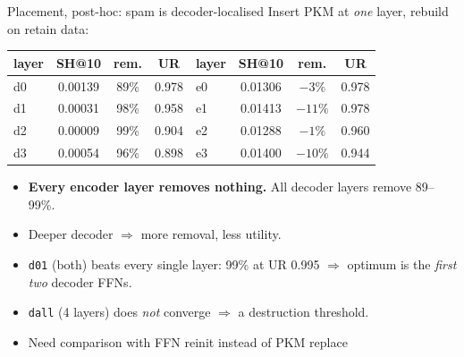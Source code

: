 \documentclass{beamer}
\begin{document}
\begin{frame}{Placement, post-hoc: spam is decoder-localised}
Insert PKM at \emph{one} layer, rebuild on retain data:
\begin{center}
\begin{tabular}{|l|c|c|c||l|c|c|c|}
\hline
layer & SH@10 & rem. & UR & layer & SH@10 & rem. & UR \\
\hline
d0 & 0.00139 & 89\% & 0.978 & e0 & 0.01306 & $-3\%$  & 0.978 \\
d1 & 0.00031 & 98\% & 0.958 & e1 & 0.01413 & $-11\%$ & 0.978 \\
d2 & 0.00009 & 99\% & 0.904 & e2 & 0.01288 & $-1\%$  & 0.960 \\
d3 & 0.00054 & 96\% & 0.898 & e3 & 0.01400 & $-10\%$ & 0.944 \\
\hline
\end{tabular}
\end{center}

\begin{itemize}
  \item \textbf{Every encoder layer removes nothing.} All decoder layers remove
        89--99\%.
  \item Deeper decoder $\Rightarrow$ more removal, less utility.
  \item \texttt{d01} (both) beats every single layer: 99\% at UR 0.995
        $\Rightarrow$ optimum is the \emph{first two} decoder FFNs.
  \item \texttt{dall} (4 layers) does \emph{not} converge $\Rightarrow$
        a destruction threshold.
  \item Need comparison with FFN reinit instead of PKM replace
\end{itemize}
\end{frame}
\end{document}
